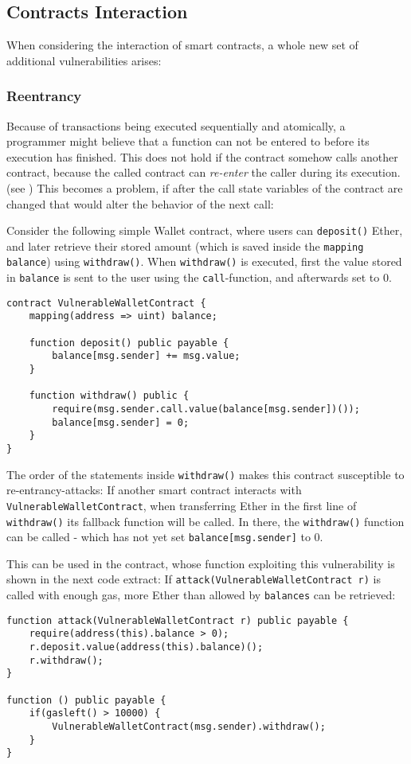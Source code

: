 \subsection{Contracts Interaction}
When considering the interaction of smart contracts, a whole new set of additional vulnerabilities arises:

\subsubsection{Reentrancy}
Because of transactions being executed sequentially and atomically, a programmer might believe that a function can not be entered to before its execution has finished. This does not hold if the contract somehow calls another contract, because the called contract can \textit{re-enter} the caller during its execution. (see \cite[3.4 Reentrancy]{atzei:attacksurvey}) This becomes a problem, if after the call state variables of the contract are changed that would alter the behavior of the next call:

Consider the following simple Wallet contract, where users can \texttt{deposit()} Ether, and later retrieve their stored amount (which is saved inside the \texttt{mapping balance}) using \texttt{withdraw()}. When \texttt{withdraw()} is executed, first the value stored in \texttt{balance} is sent to the user using the \texttt{call}-function, and afterwards set to \( 0 \).
\begin{verbatim}
contract VulnerableWalletContract {
    mapping(address => uint) balance;
    
    function deposit() public payable {
        balance[msg.sender] += msg.value;
    }
    
    function withdraw() public {
        require(msg.sender.call.value(balance[msg.sender])());
        balance[msg.sender] = 0;
    }
}
\end{verbatim}

The order of the statements inside \texttt{withdraw()} makes this contract susceptible to re-entrancy-attacks: If another smart contract interacts with \texttt{VulnerableWalletContract}, when transferring Ether in the first line of \texttt{withdraw()} its fallback function will be called. In there, the \texttt{withdraw()} function can be called - which has not yet set \texttt{balance[msg.sender]} to \( 0 \).

This can be used in the contract, whose function exploiting this vulnerability is shown in the next code extract: If \texttt{attack(VulnerableWalletContract r)} is called with enough gas, more Ether than allowed by \texttt{balances} can be retrieved:
\begin{verbatim}
function attack(VulnerableWalletContract r) public payable {
    require(address(this).balance > 0);
    r.deposit.value(address(this).balance)();
    r.withdraw();
}

function () public payable {
    if(gasleft() > 10000) {
        VulnerableWalletContract(msg.sender).withdraw();
    }
}
\end{verbatim}

